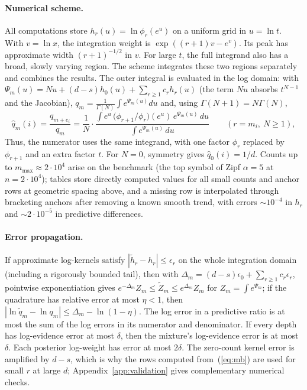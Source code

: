 \documentclass[anon]{alt2027}
\renewcommand{\eqref}[1]{(\ref{#1})}
\begin{document}
\paragraph{Numerical scheme.}
All computations store $h_r(u)=\ln\phi_r(e^u)$ on a uniform grid in $u=\ln t$. With $v=\ln x$, the integration weight is $\exp((r+1)v-e^v)$. Its peak has approximate width $(r+1)^{-1/2}$ in $v$. For large $t$, the full integrand also has a broad, slowly varying region. The scheme integrates these two regions separately and combines the results. The outer integral is evaluated in the log domain: with $\Psi_m(u)=Nu+(d-s)h_0(u)+\sum_{r\ge1}c_rh_r(u)$ (the term $Nu$ absorbs $t^{N-1}$ and the Jacobian), $q_m=\frac1{\Gamma(N)}\int e^{\Psi_m(u)}du$ and, using $\Gamma(N+1)=N\Gamma(N)$,
\begin{equation}
\hat q_m(i)=\frac{q_{m+e_i}}{q_m}=\frac1N\cdot\frac{\int e^{u}\,\bigl(\phi_{r+1}/\phi_r\bigr)(e^u)\,e^{\Psi_m(u)}\,du}{\int e^{\Psi_m(u)}\,du}\qquad(r=m_i,\ N\ge1),
\end{equation}
Thus, the numerator uses the same integrand, with one factor $\phi_r$ replaced by $\phi_{r+1}$ and an extra factor $t$. For $N=0$, symmetry gives $\hat q_0(i)=1/d$. Counts up to $m_{\max}\approx2\cdot10^4$ arise on the benchmark (the top symbol of Zipf $\alpha=5$ at $n=2\cdot10^4$); tables store directly computed values for all small counts and anchor rows at geometric spacing above, and a missing row is interpolated through bracketing anchors after removing a known smooth trend, with errors $\sim10^{-4}$ in $h_r$ and $\sim2\cdot10^{-5}$ in predictive differences.

\paragraph{Error propagation.}
If approximate log-kernels satisfy $|\tilde h_r-h_r|\le\epsilon_r$ on the whole integration domain (including a rigorously bounded tail), then with $\Delta_m=(d-s)\epsilon_0+\sum_{r\ge1}c_r\epsilon_r$, pointwise exponentiation gives $e^{-\Delta_m}Z_m\le\tilde Z_m\le e^{\Delta_m}Z_m$ for $Z_m=\int e^{\Psi_m}$; if the quadrature has relative error at most $\eta<1$, then $|\ln\tilde q_m-\ln q_m|\le\Delta_m-\ln(1-\eta)$. The log error in a predictive ratio is at most the sum of the log errors in its numerator and denominator. If every depth has log-evidence error at most $\delta$, then the mixture's log-evidence error is at most $\delta$. Each posterior log-weight has error at most $2\delta$. The zero-count kernel error is amplified by $d-s$, which is why the rows computed from~\eqref{eq:mb} are used for small $r$ at large $d$; Appendix~\ref{app:validation} gives complementary numerical checks. 
\end{document}
